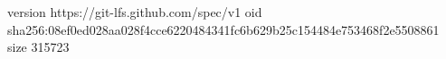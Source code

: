 version https://git-lfs.github.com/spec/v1
oid sha256:08ef0ed028aa028f4cce6220484341fc6b629b25c154484e753468f2e5508861
size 315723
